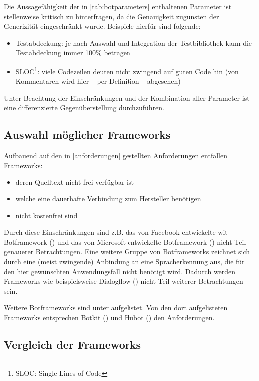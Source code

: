 Die Aussagefähigkeit der in \autoref{tab:botparameters} enthaltenen Parameter ist stellenweise kritisch zu hinterfragen, da die Genauigkeit zugunsten der Generizität eingeschränkt wurde. 
Beispiele hierfür sind folgende:
\begin{itemize}
    \item Testabdeckung: je nach Auswahl und Integration der Testbibliothek kann die Testabdeckung immer 100\% betragen
\item SLOC\footnote{SLOC: Single Lines of Code}: viele Codezeilen deuten nicht zwingend auf guten Code hin (von Kommentaren wird hier -- per Definition -- abgesehen)
\end{itemize}

Unter Beachtung der Einschränkungen und der Kombination aller Parameter ist eine differenzierte Gegenüberstellung durchzuführen.

\subsection{Auswahl möglicher Frameworks}

Aufbauend auf den in \autoref{anforderungen} gestellten Anforderungen entfallen Frameworks:
\begin{itemize}
    \item deren Quelltext nicht frei verfügbar ist
    \item welche eine dauerhafte Verbindung zum Hersteller benötigen
    \item nicht kostenfrei sind
\end{itemize}

Durch diese Einschränkungen sind z.B. das von Facebook entwickelte wit-Botframework (\cite{FacebookWitai2013})
und das von Microsoft entwickelte Botframework (\cite{MicrosoftMicrosoftBotFramework2016}) nicht Teil genauerer Betrachtungen.
Eine weitere Gruppe von Botframeworks zeichnet sich durch eine (meist zwingende) Anbindung an eine Spracherkennung aus, die für den hier gewünschten Anwendungsfall nicht benötigt wird. Dadurch werden Frameworks wie beispielsweise Dialogflow (\cite{DialogflowDialogflow2018}) nicht Teil weiterer Betrachtungen sein.


Weitere Botframeworks sind unter \cite{AbdelhaiawesomebotsAwesomeLinks2018} aufgelistet. 
Von den dort aufgelisteten Frameworks entsprechen Botkit (\cite{BotkitBotkitToolkitbuilding2017}) und Hubot (\cite{GitHubGettingStartedHubot2009})  den Anforderungen.

\subsection{Vergleich der Frameworks}

